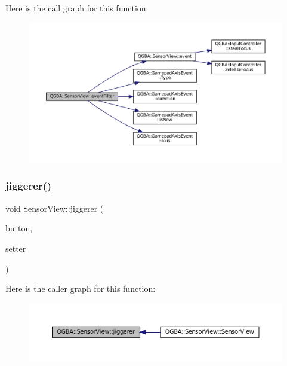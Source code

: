 Here is the call graph for this function\+:
\nopagebreak
\begin{figure}[H]
\begin{center}
\leavevmode
\includegraphics[width=350pt]{class_q_g_b_a_1_1_sensor_view_ac36eccf225760726c912ab688ef41270_cgraph}
\end{center}
\end{figure}
\mbox{\label{class_q_g_b_a_1_1_sensor_view_a2747614dc92dfe149fff8cc532063fe6}} 
\subsubsection{\texorpdfstring{jiggerer()}{jiggerer()}}
{\footnotesize\ttfamily void Sensor\+View\+::jiggerer (\begin{DoxyParamCaption}\item[{Q\+Abstract\+Button $\ast$}]{button,  }\item[{void(Input\+Controller\+::$\ast$)(\mbox{\hyperlink{ioapi_8h_a787fa3cf048117ba7123753c1e74fcd6}{int}})}]{setter }\end{DoxyParamCaption})\hspace{0.3cm}{\ttfamily [private]}}

Here is the caller graph for this function\+:
\nopagebreak
\begin{figure}[H]
\begin{center}
\leavevmode
\includegraphics[width=350pt]{class_q_g_b_a_1_1_sensor_view_a2747614dc92dfe149fff8cc532063fe6_icgraph}
\end{center}
\end{figure}
\mbox{\label{class_q_g_b_a_1_1_sensor_view_a76f391e13618d7f97f37076ce16ebd64}} 
